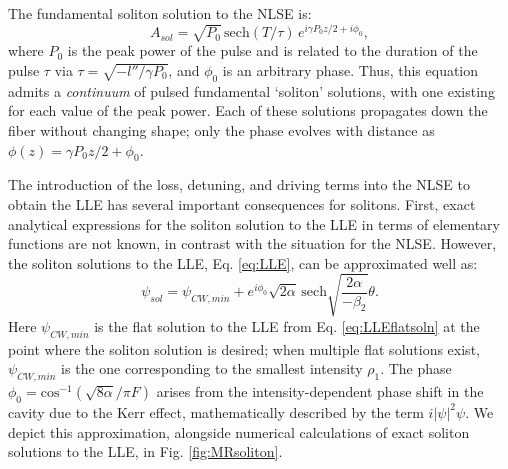 The fundamental soliton solution to the NLSE is:
\begin{equation}
A_{sol}=\sqrt{P_0}\, \mathrm{sech}\left(T/\tau\right)\,e^{i\gamma P_0 z/2+i\phi_0},
\end{equation}
where $P_0$ is the peak power of the pulse and is related to the duration of the pulse $\tau$ via $\tau=\sqrt{-l''/\gamma P_0}$, and $\phi_0$ is an arbitrary phase. Thus, this equation admits a \textit{continuum} of pulsed fundamental `soliton' solutions, with one existing for each value of the peak power. Each of these solutions propagates down the fiber without changing shape; only the phase evolves with distance as $\phi(z)=\gamma P_0 z/2+\phi_0$.


The introduction of the loss, detuning, and driving terms into the NLSE to obtain the LLE has several important consequences for solitons. First, exact analytical expressions for the soliton solution to the LLE in terms of elementary functions are not known, in contrast with the situation for the NLSE. However, the soliton solutions to the LLE, Eq. \ref{eq:LLE}, can be approximated well as:
\begin{equation}
\psi_{sol}=\psi_{CW,min}+e^{i\phi_0}\sqrt{2\alpha}\,\mathrm{sech}\sqrt{\frac{2\alpha}{-\beta_2}}\theta. \label{eq:LLEsoliton}
\end{equation}
Here $\psi_{CW,min}$ is the flat solution to the LLE from Eq. \ref{eq:LLEflatsoln} at the point where the soliton solution is desired; when multiple flat solutions exist, $\psi_{CW,min}$ is the one corresponding to the smallest intensity $\rho_1$. The phase $\phi_0=\mathrm{cos}^{-1}(\sqrt{8\alpha}/\pi F)$ arises from the intensity-dependent phase shift in the cavity due to the Kerr effect, mathematically described by the term $i|\psi|^2\psi$. We depict this approximation, alongside numerical calculations of exact soliton solutions to the LLE, in Fig. \ref{fig:MRsoliton}.



